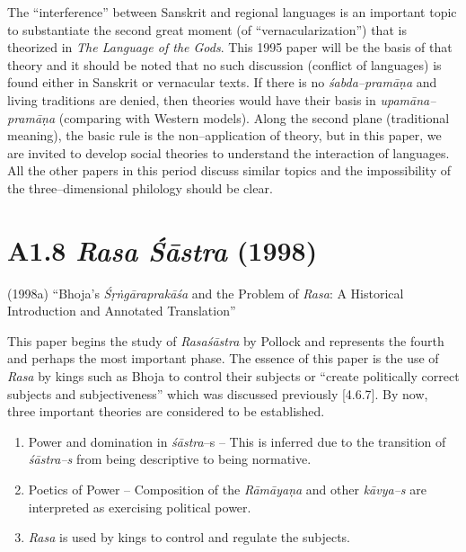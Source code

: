 The “interference” between Sanskrit and regional languages is an important topic to substantiate the second great moment (of “vernacularization”) that is theorized in \textit{The Language of the Gods}. This 1995 paper will be the basis of that theory and it should be noted that no such discussion (conflict of languages) is found either in Sanskrit or vernacular texts. If there is no \textit{śabda–pramāṇa} and living traditions are denied, then theories would have their basis in \textit{upamāna–pramāṇa} (comparing with Western models). Along the second plane (traditional meaning), the basic rule is the non–application of theory, but in this paper, we are invited to develop social theories to understand the interaction of languages. All the other papers in this period discuss similar topics and the impossibility of the three–dimensional philology should be clear.

\vspace{-.3cm}

\section*{A1.8 \textit{Rasa Śāstra} (1998)}

(1998a) “Bhoja's {\it Śṛṅgāraprakāśa} and the Problem of {\it Rasa}: A Historical Introduction and Annotated Translation”

This paper begins the study of \textit{Rasaśāstra} by Pollock and represents the fourth and perhaps the most important phase. The essence of this paper is the use of \textit{Rasa} by kings such as Bhoja to control their subjects or “create politically correct subjects and subjectiveness” which was discussed previously [4.6.7]. By now, three important theories are considered to be established.

\vspace{-.3cm}

\begin{enumerate}
\itemsep=0pt
\item Power and domination in \textit{śāstra}–s – This is inferred due to the transition of \textit{śāstra–s }from being descriptive to being normative.

 \item Poetics of Power – Composition of the \textit{Rāmāyaṇa} and other\textit{ kāvya–s }are interpreted as exercising political power.

 \item \textit{Rasa} is used by kings to control and regulate the subjects.

\end{enumerate}

